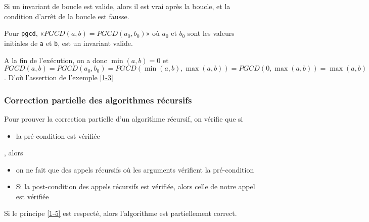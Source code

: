 \begin{proposition}
	Si un invariant de boucle est valide, alors il est vrai après la boucle, et la condition d'arrêt de la boucle est fausse.
\end{proposition}

\begin{example}
	Pour \texttt{pgcd}, «$PGCD(a,b) = PGCD(a_0, b_0)$» où $a_0$ et $b_0$ sont les valeurs initiales de \texttt{a} et \texttt{b}, est un invariant valide.
	
	A la fin de l'exécution, on a donc $\min(a,b) = 0$ et $PGCD(a,b) = PGCD(a_0, b_0) = PGCD(\min(a,b), \max(a,b)) = PGCD(0, \max(a,b)) = \max(a,b)$. D'où l'assertion de l'exemple \ref{1-3}
\end{example}

\subsubsection{Correction partielle des algorithmes récursifs}


\begin{principe}
	Pour prouver la correction partielle d'un algorithme récursif, on vérifie que si \begin{itemize}[label=$\bullet$]
		\item la pré-condition est vérifiée
	\end{itemize}, alors
	\begin{itemize}[label=$\bullet$] 
		\item on ne fait que des appels récursifs où les arguments vérifient la pré-condition
		\item Si la post-condition des appels récursifs est vérifiée, alors celle de notre appel est vérifiée
	\end{itemize}
	\label{1-5}
\end{principe}

\begin{theorem}
	Si le principe \ref{1-5} est respecté, alors l'algorithme est partiellement correct.
\end{theorem}

